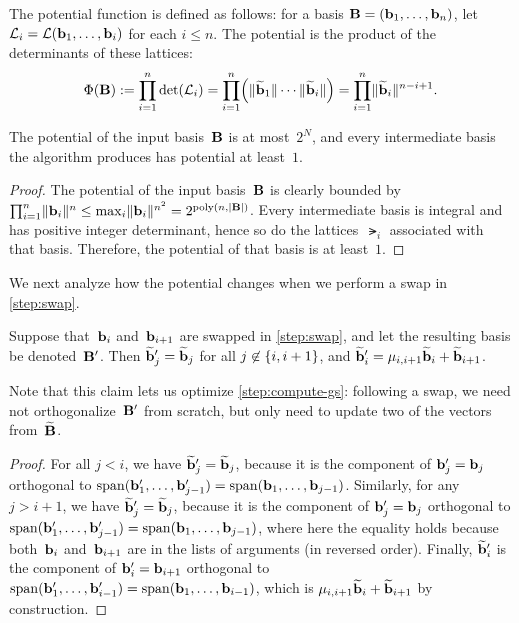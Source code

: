 \documentclass[11pt]{article}
\begin{document}
The potential function is defined as follows: for a basis
$\mathbf{B} = (\mathbf{b}_{1}, \ldots, \mathbf{b}_{n})$, let
$\mathcal{L}_{i} = \mathcal{L}(\mathbf{b}_{1}, \ldots, \mathbf{b}_{i})$ for each $i \leq n$.
The potential is the product of the determinants of these lattices:
\begin{equation}
  \label{eq:potential}
  \Phi(\matB) := \prod_{i=1}^{n} \det(\lat_{i}) = \prod_{i=1}^{n}
  \parens*{\length{\gs{\vecb}_{1}} \cdots \length{\gs{\vecb}_{i}}} =
  \prod_{i=1}^{n} \length{\gs{\vecb}_{i}}^{n-i+1}.
\end{equation}

\begin{claim}
  \label{clm:potential}
  The potential of the input basis~$\mathbf{B}$ is at most~$2^{N}$, and
  every intermediate basis the algorithm produces has potential at
  least~$1$.
\end{claim}

\begin{proof}
  The potential of the input basis~$\mathbf{B}$ is clearly bounded by
  $\prod_{i=1}^{n} \lVert\mathbf{b}_{i}\rVert^{n} \leq \max_{i}
  \lVert\mathbf{b}_{i}\rVert^{n^{2}} = 2^{\operatorname{poly}(n,\lvert\mathbf{B}\rvert)}$. Every
  intermediate basis is integral and has positive integer determinant,
  hence so do the lattices~$\lat_{i}$ associated with that basis.
  Therefore, the potential of that basis is at least~$1$.
\end{proof}

\noindent We next analyze how the potential changes when we perform a
swap in \cref{step:swap}.

\begin{claim}
  \label{clm:swap-gs}
  Suppose that~$\mathbf{b}_{i}$ and~$\mathbf{b}_{i+1}$ are swapped in
  \cref{step:swap}, and let the resulting basis be denoted~$\mathbf{B}'$.
  Then $\widetilde{\mathbf{b}}'_{j} = \widetilde{\mathbf{b}}_{j}$ for all
  $j \not\in \{i,i+1\}$, and
  $\widetilde{\mathbf{b}}'_{i} = \mu_{i,i+1} \widetilde{\mathbf{b}}_{i} + \widetilde{\mathbf{b}}_{i+1}$.
\end{claim}

Note that this claim lets us optimize \cref{step:compute-gs}:
following a swap, we need not orthogonalize~$\mathbf{B}'$ from scratch, but
only need to update two of the vectors from~$\widetilde{\mathbf{B}}$.

\begin{proof}
  For all $j < i$, we have $\widetilde{\mathbf{b}}'_{j} = \widetilde{\mathbf{b}}_{j}$, because
  it is the component of $\mathbf{b}'_{j} = \mathbf{b}_{j}$ orthogonal to
  $\operatorname{span}(\mathbf{b}'_{1}, \ldots, \mathbf{b}'_{j-1}) = \operatorname{span}(\mathbf{b}_{1}, \ldots,
  \mathbf{b}_{j-1})$. Similarly, for any $j > i+1$, we have
  $\widetilde{\mathbf{b}}'_{j} = \widetilde{\mathbf{b}}_{j}$, because it is the component of
  $\mathbf{b}'_{j} = \mathbf{b}_{j}$ orthogonal to
  $\operatorname{span}(\mathbf{b}'_{1}, \ldots, \mathbf{b}'_{j-1}) = \operatorname{span}(\mathbf{b}_{1}, \ldots,
  \mathbf{b}_{j-1})$, where here the equality holds because
  both~$\mathbf{b}_{i}$ and~$\mathbf{b}_{i+1}$ are in the lists of arguments (in
  reversed order). Finally, $\widetilde{\mathbf{b}}'_{i}$ is the component of
  $\mathbf{b}'_{i} = \mathbf{b}_{i+1}$ orthogonal to
  $\operatorname{span}(\mathbf{b}'_{1}, \ldots, \mathbf{b}'_{i-1}) = \operatorname{span}(\mathbf{b}_{1}, \ldots,
  \mathbf{b}_{i-1})$, which is
  $\mu_{i,i+1} \widetilde{\mathbf{b}}_{i} + \widetilde{\mathbf{b}}_{i+1}$ by construction.
\end{proof}
\end{document}
